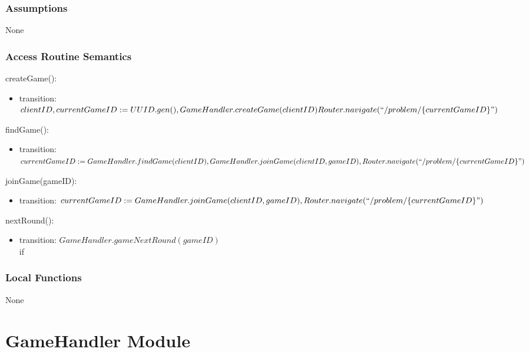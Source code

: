 \documentclass[12pt, titlepage]{article}
\begin{document}
\subsubsection{Assumptions}

None

\subsubsection{Access Routine Semantics}

\noindent createGame():
\begin{itemize}
\item transition: $clientID, currentGameID :=  UUID.gen(),\\ GameHandler.createGame(clientID)\\
Router.navigate(``/problem/\{currentGameID\}")$
\end{itemize}

\noindent findGame():
\begin{itemize}
\item transition: $currentGameID := GameHandler.findGame(clientID), 
\\GameHandler.joinGame(clientID, gameID), 
\\Router.navigate(``/problem/\{currentGameID\}")$ 
\end{itemize}

\noindent joinGame(gameID):
\begin{itemize}
\item transition: $currentGameID := GameHandler.joinGame(clientID, gameID),\\ Router.navigate(``/problem/\{currentGameID\}")$
\end{itemize}

\noindent nextRound():
\begin{itemize}
\item transition: $GameHandler.gameNextRound(gameID)$\\
if 
\end{itemize}


\subsubsection{Local Functions}

None


\newpage



\section{GameHandler Module} \label{GameHandler} 
\end{document}
